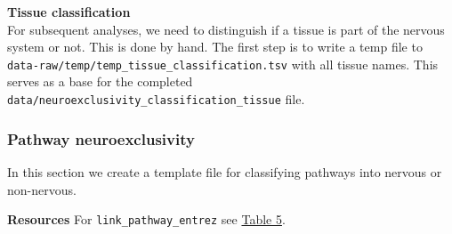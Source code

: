 \textbf{Tissue classification}\\
For subsequent analyses, we need to distinguish if a tissue is part of
the nervous system or not. This is done by hand. The first step is to
write a temp file to
\texttt{data-raw/temp/temp\_tissue\_classification.tsv} with all tissue
names. This serves as a base for the completed
\texttt{data/neuroexclusivity\_classification\_tissue} file.

\begin{Shaded}
\end{Shaded}

\hypertarget{pathway-neuroexclusivity}{%
\subsubsection{Pathway
neuroexclusivity}\label{pathway-neuroexclusivity}}

In this section we create a template file for classifying pathways into
nervous or non-nervous.

\textbf{Resources} For \texttt{link\_pathway\_entrez} see
\hyperref[tab:link_pathway_entrez]{Table 5}.

\begin{table}[H]

\caption{\label{tab:pathway_names}KEGG pathway names.}
\end{table}

